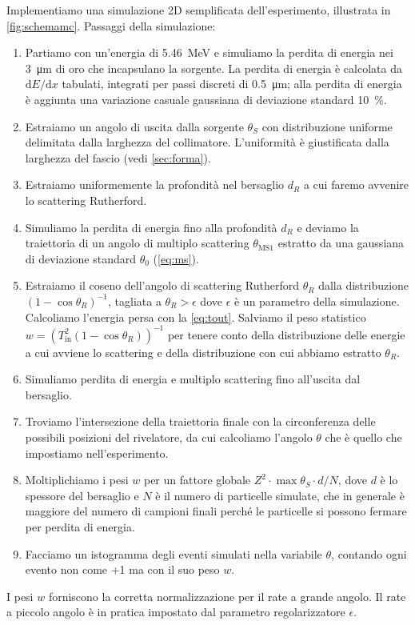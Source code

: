 Implementiamo una simulazione 2D semplificata dell'esperimento,
illustrata in \autoref{fig:schemamc}.
Passaggi della simulazione:
\begin{enumerate}
	\item
	Partiamo con un'energia di \SI{5.46}{MeV}
	e simuliamo la perdita di energia nei \SI{3}{\micro m} di oro che incapsulano la sorgente.
	La perdita di energia è calcolata da $\mathrm dE/\mathrm dx$ tabulati\footnotemark,
	integrati per passi discreti di \SI{0.5}{\micro m};
	alla perdita di energia è aggiunta una variazione casuale gaussiana di deviazione standard \SI{10}\%.
	\item
	Estraiamo un angolo di uscita dalla sorgente $\theta_S$ con distribuzione uniforme
	delimitata dalla larghezza del collimatore.
	L'uniformità è giustificata dalla larghezza del fascio (vedi \autoref{sec:forma}). 
	\item
	Estraiamo uniformemente la profondità nel bersaglio $d_R$ a cui faremo avvenire lo scattering Rutherford.
	\item
	Simuliamo la perdita di energia fino alla profondità $d_R$
	e deviamo la traiettoria di un angolo di multiplo scattering $\theta_\text{MS1}$
	estratto da una gaussiana di deviazione standard $\theta_0$ (\autoref{eq:ms}).
	\item
	Estraiamo il coseno dell'angolo di scattering Rutherford $\theta_R$
	dalla distribuzione $(1-\cos\theta_R)^{-1}$,
	tagliata a $\theta_R>\epsilon$ dove $\epsilon$ è un parametro della simulazione.
	Calcoliamo l'energia persa con la \eqref{eq:tout}.
	Salviamo il peso statistico $w = (T_\text{in}^2 (1-\cos\theta_R))^{-1}$
	per tenere conto della distribuzione delle energie a cui avviene lo scattering
	e della distribuzione con cui abbiamo estratto $\theta_R$.
	\item
	Simuliamo perdita di energia e multiplo scattering fino all'uscita dal bersaglio.
	\item
	Troviamo l'intersezione della traiettoria finale con la circonferenza delle possibili posizioni del rivelatore,
	da cui calcoliamo l'angolo $\theta$ che è quello che impostiamo nell'esperimento.
	\item
	Moltiplichiamo i pesi $w$ per un fattore globale
	$Z^2 \cdot \max \theta_S \cdot d / N$,
	dove $d$ è lo spessore del bersaglio
	e $N$ è il numero di particelle simulate,
	che in generale è maggiore del numero di campioni finali
	perché le particelle si possono fermare per perdita di energia.
	\item
	Facciamo un istogramma degli eventi simulati nella variabile $\theta$,
	contando ogni evento non come +1 ma con il suo peso $w$.
\end{enumerate}
I pesi $w$ forniscono la corretta normalizzazione per il rate a grande angolo.
Il rate a piccolo angolo è in pratica impostato dal parametro regolarizzatore $\epsilon$.

